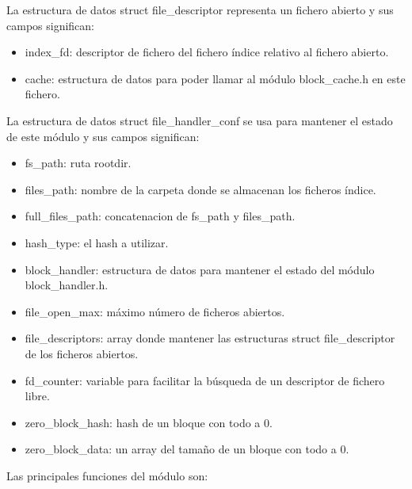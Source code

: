 \documentclass[a4paper,12pt]{article}
\begin{document}
La estructura de datos struct file\_descriptor representa un fichero abierto y sus campos significan:
\begin{itemize}
\item index\_fd: descriptor de fichero del fichero índice relativo al fichero abierto.
\item cache: estructura de datos para poder llamar al módulo block\_cache.h en este fichero.
\end{itemize}




La estructura de datos struct file\_handler\_conf se usa para mantener el estado de este módulo y sus campos significan:

\begin{itemize}
\item fs\_path: ruta rootdir.
\item files\_path: nombre de la carpeta donde se almacenan los ficheros índice.
\item full\_files\_path: concatenacion de fs\_path y files\_path.
\item hash\_type: el hash a utilizar.
\item block\_handler: estructura de datos para mantener el estado del módulo block\_handler.h.
\item file\_open\_max: máximo número de ficheros abiertos.
\item file\_descriptors: array donde mantener las estructuras struct file\_descriptor de los ficheros abiertos.
\item fd\_counter: variable para facilitar la búsqueda de un descriptor de fichero libre.
\item zero\_block\_hash: hash de un bloque con todo a 0.
\item zero\_block\_data: un array del tamaño de un bloque con todo a 0.
\end{itemize}

Las principales funciones del módulo son:
\end{document}
